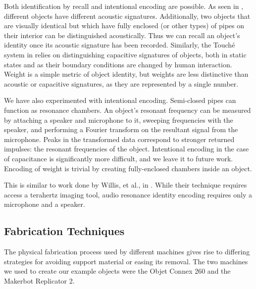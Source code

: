 Both identification by recall and intentional encoding are possible.  As seen in \cite{Ono-touchandactivate}, different objects have different acoustic signatures.  Additionally, two objects that are visually identical but which have fully enclosed (or other types) of pipes on their interior can be distinguished acoustically.  Thus we can recall an object's identity once its acoustic signature has been recorded.  Similarly, the Touch\'{e} system in \cite{Sato-touche} relies on distinguishing capacitive signatures of objects, both in static states and as their boundary conditions are changed by human interaction.  Weight is a simple metric of object identity, but weights are less distinctive than acoustic or capacitive signatures, as they are represented by a single number.

We have also experimented with intentional encoding.  Semi-closed pipes can function as resonance chambers.  An object's resonant frequency can be measured by attaching a speaker and microphone to it, sweeping frequencies with the speaker, and performing a Fourier transform on the resultant signal from the microphone.  Peaks in the transformed data correspond to stronger returned impulses: the resonant frequencies of the object.  Intentional encoding in the case of capacitance is significantly more difficult, and we leave it to future work.  Encoding of weight is trivial by creating fully-enclosed chambers inside an object.

This is similar to work done by Willis, et al., in \cite{Willis-infrastructs}.  While their technique requires access a terahertz imaging tool, audio resonance identity encoding requires only a microphone and a speaker.

\subsection{Fabrication Techniques}


The physical fabrication process used by different machines gives rise to differing strategies for avoiding support material or easing its removal.  The two machines we used to create our example objects were the Objet Connex 260 and the Makerbot Replicator 2.

